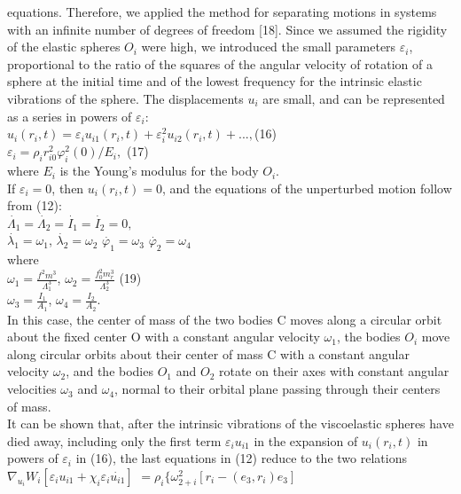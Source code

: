 \documentclass[fontsize = 11pt,a4paper]{article}
\begin{document}
\begin{multicols}{2}
equations. Therefore, we applied the method
for separating motions in systems with an infinite
number of degrees of freedom [18]. Since we assumed
the rigidity of the elastic spheres $O_i$ were high, we
introduced the small parameters $\varepsilon_i$, proportional to
the ratio of the squares of the angular velocity of
rotation of a sphere at the initial time and of the lowest
frequency for the intrinsic elastic vibrations of the
sphere. The displacements $u_i$ are small, and can be
represented as a series in powers of $\varepsilon_i$:\\
$u_i(r_i,t) = \varepsilon_i u_{i1}(r_i,t) +  \varepsilon_i^2 u_{i2}(r_i,t) + ...,$\hfill (16) \\
$\varepsilon_i = \rho_i r^2_{i0} \varphi^2_i(0) / E_i,$ \hfill (17) \\
where $E_i$ is the Young’s modulus for the body $O_i$.\\
If $\varepsilon_i  = 0$, then $u_i(r_i, t) = 0$, and the equations of
the unperturbed motion follow from (12):\\
$\dot{\Lambda_1} = \dot{\Lambda_2} = \dot{I_1} = \dot{I_2} = 0,$\\
$\dot{\lambda_1} = \omega_1$,   $\dot{\lambda_2} = \omega_2$  $\dot{\varphi_1} = \omega_3$  $\dot{\varphi_2} = \omega_4$\\
where \\
$\omega_1 = \frac{f^2m^3}{\Lambda^3_1}$,    $\omega_2 = \frac{f^2_0 m^3_r}{\Lambda^3_2}$ \hfill (19)\\
$\omega_3 = \frac{I_1}{A_1}$,  $\omega_4 = \frac{I_2}{A_2}$.\\
In this case, the center of mass of the two bodies C
moves along a circular orbit about the fixed center
O with a constant angular velocity $\omega_1$, the bodies
$O_i$ move along circular orbits about their center of
mass C with a constant angular velocity $\omega_2$, and the
bodies $O_1$ and $O_2$ rotate on their axes with constant
angular velocities $\omega_3$ and $\omega_4$, normal to their orbital
plane passing through their centers of mass. \\
\indent It can be shown that, after the intrinsic vibrations
of the viscoelastic spheres have died away, including
only the first term $\varepsilon_i u_{i1}$ in the expansion of $u_i(r_i, t)$ in
powers of $\varepsilon_i$ in (16), the last equations in (12) reduce
to the two relations\\
$\nabla_{u_i}W_i[\varepsilon_i u_{i1} + \chi_i \varepsilon_i \dot{u_{i1}}]$
$ = \rho_i \{ \omega^2_{2+i} [ r_i - (e_3,r_i)e_3]$\\

\end{multicols}
\end{document}
